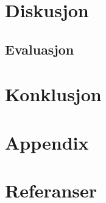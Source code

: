 {\section{Diskusjon}



\subsection{Evaluasjon}

\section{Konklusjon}

\newpage
\section{Appendix}
\section{Referanser}
\begingroup
\renewcommand{\section}[2]{}%


\endgroup



 







